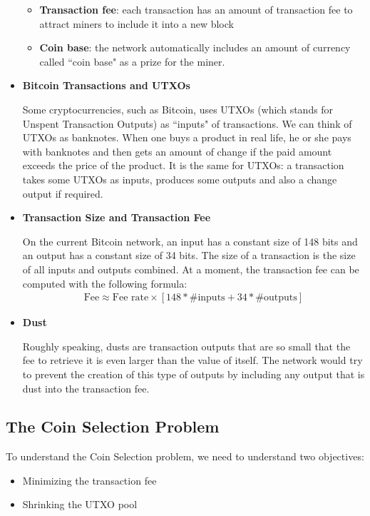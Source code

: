 \begin{itemize}
\begin{itemize}
        \item \textbf{Transaction fee}: each transaction has an amount of transaction fee to attract miners to include it into a new block
        \item \textbf{Coin base}: the network automatically includes an amount of currency called ``coin base" as a prize for the miner.
      \end{itemize}
    \item \textbf{Bitcoin Transactions and UTXOs}
      \par Some cryptocurrencies, such as Bitcoin, uses UTXOs (which stands for Unspent Transaction Outputs) as ``inputs" of transactions. We can think of UTXOs as banknotes. When one buys a product in real life, he or she pays with banknotes and then gets an amount of change if the paid amount exceeds the price of the product. It is the same for UTXOs: a transaction takes some UTXOs as inputs, produces some outputs and also a change output if required.
    \item \textbf{Transaction Size and Transaction Fee}
      \par On the current Bitcoin network, an input has a constant size of 148 bits and an output has a constant size of 34 bits. The size of a transaction is the size of all inputs and outputs combined. At a moment, the transaction fee can be computed with the following formula:
      \begin{align*}
        \text{Fee} \approx \text{Fee rate} \times [148 * \text{\# inputs} + 34 * \text{\# outputs}]
      \end{align*}
    \item \textbf{Dust}
      \par Roughly speaking, dusts are transaction outputs that are so small that the fee to retrieve it is even larger than the value of itself. The network would try to prevent the creation of this type of outputs by including any output that is dust into the transaction fee.
  \end{itemize}

  \subsection{The Coin Selection Problem}
    \par To understand the Coin Selection problem, we need to understand two objectives:
      \begin{itemize}
        \item Minimizing the transaction fee
        \item Shrinking the UTXO pool
      \end{itemize}

